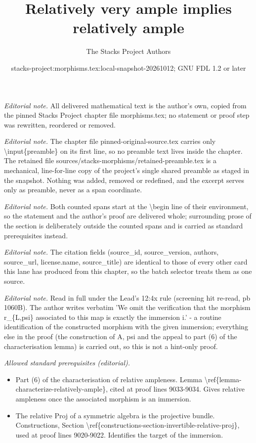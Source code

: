\documentclass[10pt,a4paper]{amsart}
\title{Relatively very ample implies relatively ample}
\author{The Stacks Project Authors}
\date{stacks-project:morphisms.tex:local-snapshot-20261012; GNU FDL 1.2 or later}
\theoremstyle{plain}
\theoremstyle{definition}
\theoremstyle{remark}
\numberwithin{equation}{subsection}
\begin{document}
\maketitle
\setcounter{subsection}{1}
\noindent\textit{Editorial note.} All delivered mathematical text is the author's own, copied from the pinned Stacks Project chapter file morphisms.tex; no statement or proof step was rewritten, reordered or removed.\par\medskip
\noindent\textit{Editorial note.} The chapter file pinned-original-source.tex carries only \textbackslash{}input\{preamble\} on its first line, so no preamble text lives inside the chapter. The retained file sources/stacks-morphisms/retained-preamble.tex is a mechanical, line-for-line copy of the project's single shared preamble as staged in the snapshot. Nothing was added, removed or redefined, and the excerpt serves only as preamble, never as a span coordinate.\par\medskip
\noindent\textit{Editorial note.} Both counted spans start at the \textbackslash{}begin line of their environment, so the statement and the author's proof are delivered whole; surrounding prose of the section is deliberately outside the counted spans and is carried as standard prerequisites instead.\par\medskip
\noindent\textit{Editorial note.} The citation fields (source\_id, source\_version, authors, source\_url, license.name, source\_title) are identical to those of every other card this lane has produced from this chapter, so the batch selector treats them as one source.\par\medskip
\noindent\textit{Editorial note.} Read in full under the Lead's 12:4x rule (screening hit re-read, pb 1060B). The author writes verbatim 'We omit the verification that the morphism r\_\{L,psi\} associated to this map is exactly the immersion i.' - a routine identification of the constructed morphism with the given immersion; everything else in the proof (the construction of A, psi and the appeal to part (6) of the characterisation lemma) is carried out, so this is not a hint-only proof.\par\medskip
\noindent\textit{Allowed standard prerequisites (editorial).}\begin{itemize}
\item Part (6) of the characterisation of relative ampleness. Lemma \textbackslash{}ref\{lemma-characterize-relatively-ample\}, cited at proof lines 9033-9034. Gives relative ampleness once the associated morphism is an immersion.
\item The relative Proj of a symmetric algebra is the projective bundle. Constructions, Section \textbackslash{}ref\{constructions-section-invertible-relative-proj\}, used at proof lines 9020-9022. Identifies the target of the immersion.
\end{itemize}\medskip
\end{document}
